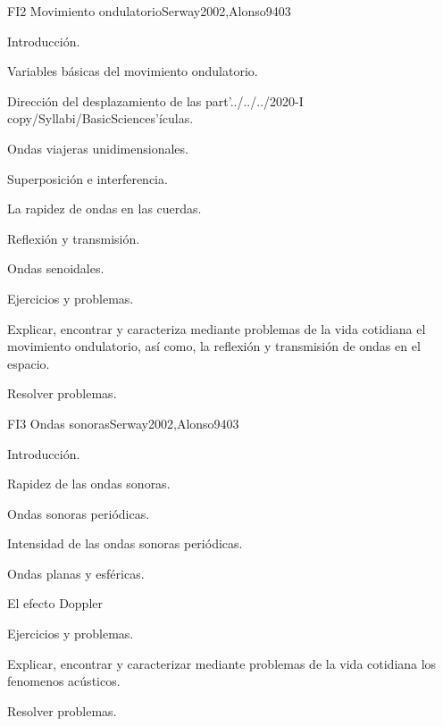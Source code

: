 \begin{syllabus}
\begin{unit}{FI2 Movimiento ondulatorio}{}{Serway2002,Alonso94}{0}{3}
\begin{topics}
      \item Introducción.
        \item Variables básicas del movimiento ondulatorio.
        \item Dirección del desplazamiento de las part'../../../2020-I copy/Syllabi/BasicSciences'ículas.
        \item Ondas viajeras unidimensionales.
        \item Superposición e interferencia.
        \item La rapidez de ondas en las cuerdas.
        \item Reflexión y transmisión.
        \item Ondas senoidales.
        \item Ejercicios y problemas.
   \end{topics}
   \begin{learningoutcomes}
      \item Explicar, encontrar y caracteriza mediante problemas de la vida cotidiana el movimiento ondulatorio, así como, la reflexión y transmisión de ondas en el espacio.
      \item Resolver problemas.
   \end{learningoutcomes}
\end{unit}

\begin{unit}{FI3 Ondas sonoras}{}{Serway2002,Alonso94}{0}{3}
\begin{topics}
      \item  Introducción.
        \item Rapidez de las ondas sonoras.
        \item Ondas sonoras periódicas.
        \item Intensidad de las ondas sonoras periódicas.
        \item Ondas planas y esféricas.
        \item El efecto Doppler
        \item Ejercicios y problemas.
   \end{topics}
   \begin{learningoutcomes}
      \item Explicar, encontrar y caracterizar mediante problemas de la vida cotidiana los fenomenos acústicos.
      \item Resolver problemas.
   \end{learningoutcomes}
\end{unit}


\end{syllabus}
